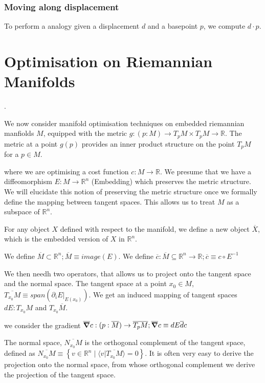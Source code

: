 \documentclass[11pt]{book}
\begin{document}
\subsubsection{Moving along displacement} To perform a analogy given a displacement $d$ and a basepoint $p$, we compute $d \cdot p$.


\section{Optimisation on Riemannian Manifolds}
\label{section:optim-on-riem}.

We now consider manifold optimisation techniques on embedded riemannian manfiolds $M$,
equipped with the metric $g: (p: M) \rightarrow T_p M  \times T_p M \rightarrow \mathbb R$.
The metric at a point $g(p)$ provides an inner product structure on the point $T_pM$
for a $p \in M$.

where we are optimising a cost function $c: M \rightarrow \mathbb R$.
We presume that we have a diffeomorphism $E: M \rightarrow \mathbb R^n$ (Embedding) which
preserves the metric structure. We will elucidate this notion of preserving
the metric structure once we formally define the mapping between tangent spaces.
This allows us to treat $M$ as a subspace of $\mathbb R^n$.

For any object $X$
defined with respect to the manifold, we define a new object $\overline X$, which
is the embedded version of $X$ in $\mathbb R^n$.

We define $\overline M \subset \mathbb R^n; \overline M \equiv image(E)$.
We define $\overline c: \overline M \subseteq \mathbb R^n \rightarrow \mathbb R; \overline c \equiv c \circ E^{-1}$

We then needh two operators, that allows us to project onto the tangent space
and the normal space. The tangent space at a point $x_0 \in M$, $\overline{T_{x_0} M} \equiv span(\partial_i E |_{E(x_0)})$.
We get an induced mapping of tangent spaces $dE: T_{x_0} M$ and $T_{x_0} \overline M$.

we consider the gradient
$\overline \grad c : (p: \overline M) \rightarrow \overline{T_p M}; \overline \grad c \equiv dE \overline dc$

The normal space,
$\overline{N_{x_0} M}$ is the orthogonal complement of the tangent space, defined
as $\overline{N_{x_0} M} \equiv \left\{ v \in \mathbb R^n \mid \langle v | \overline{T_{x_0} M} \rangle = 0 \right\}$.
It is often very easy to derive the projection onto the normal space, from
whose orthogonal complement we derive the projection of the tangent space.
\end{document}
